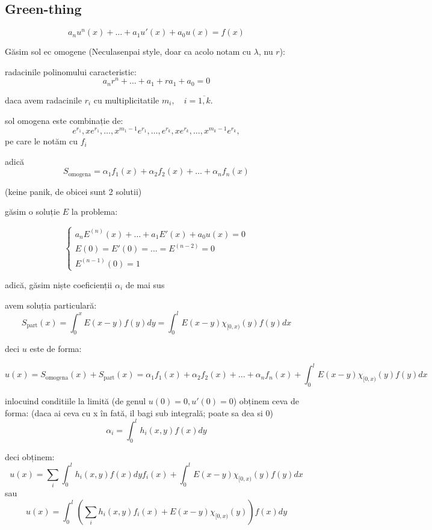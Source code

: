 \documentclass{article}
\begin{document}
\subsection*{Green-thing}

\[ a_nu^{n}(x)+\ldots +a_1u'(x)+a_0u(x) = f(x) \]

Găsim sol ec omogene (Neculasenpai style, doar ca acolo notam cu \(\lambda\), nu $r$):

radacinile polinomului caracteristic:
\[ a_n r^{n}+\ldots +a_1 + r a_1+a_0 = 0 \]

daca avem radacinile \( r_i \) cu multiplicitatile \(m_i,\quad i = \overline{1, k}\).

sol omogena este combinație de:
\[ e^{r_1}, x e^{r_1}, \ldots, x^{m_1-1}e^{r_1}, \ldots,
e^{r_k}, x e^{r_k}, \ldots, x^{m_k-1}e^{r_k},
\]
pe care le notăm cu $f_i$

adică
\[
S_{\text{omogena}} = \alpha_{1} f_1(x)+ \alpha_{2} f_2(x)+ \ldots+ \alpha_{n} f_n(x)
\]

(keine panik, de obicei sunt 2 solutii)

găsim o soluție \(E\) la problema:

\[
\begin{cases}
  a_nE^{(n)}(x)+\ldots +a_1E'(x)+a_0u(x) = 0\\
  E(0) = E'(0) = \ldots = E^{(n-2)} = 0\\
  E^{(n-1)}(0) = 1
\end{cases}
\]

adică, găsim niște coeficienții \(\alpha_{i}\) de mai sus

avem soluția particulară:
\[
S_{\text{part}}(x) = \int_0^x E(x-y) f(y) dy = \int_0^l E(x-y) \chi_{[0, x)}(y) f(y) dx
  \]

  deci $u$ este de forma:

 \[
 u(x) = S_{\text{omogena}}(x) + S_{\text{part}}(x) =
\alpha_{1} f_1(x)+ \alpha_{2} f_2(x)+ \ldots+ \alpha_{n} f_n(x)+
  \int_0^l E(x-y) \chi_{[0, x)}(y) f(y) dx
    \]

    inlocuind conditiile la limită (de genul $u(0) = 0, u'(0)=0$) obținem ceva de forma:
    (daca ai ceva cu x în fată, il bagi sub integrală; poate sa dea si 0)
    \[ \alpha_i = \int_0^l h_i(x,y) f(x) dy \]


    deci obținem:
    \[
    u(x) = \sum_i \int_0^l h_i(x,y) f(x) dy f_i(x) +
    \int_0^l E(x-y) \chi_{[0, x)}(y) f(y) dx
      \]
      sau
      \[
    u(x) =  \int_0^l \left(\sum_i h_i(x,y) f_i(x) +E(x-y) \chi_{[0, x)}(y)\right) f(x) dy
      \]
\end{document}
